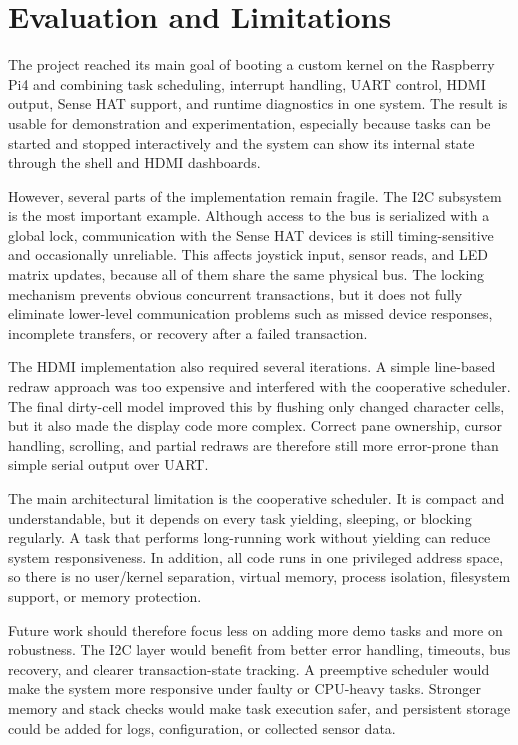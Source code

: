 \section{Evaluation and Limitations}

The project reached its main goal of booting a custom kernel on the Raspberry Pi4 and combining task scheduling, interrupt handling, UART control, HDMI output, Sense HAT support, and runtime diagnostics in one system. The result is usable for demonstration and experimentation, especially because tasks can be started and stopped interactively and the system can show its internal state through the shell and HDMI dashboards.

However, several parts of the implementation remain fragile. The I2C subsystem is the most important example. Although access to the bus is serialized with a global lock, communication with the Sense HAT devices is still timing-sensitive and occasionally unreliable. This affects joystick input, sensor reads, and LED matrix updates, because all of them share the same physical bus. The locking mechanism prevents obvious concurrent transactions, but it does not fully eliminate lower-level communication problems such as missed device responses, incomplete transfers, or recovery after a failed transaction.

The HDMI implementation also required several iterations. A simple line-based redraw approach was too expensive and interfered with the cooperative scheduler. The final dirty-cell model improved this by flushing only changed character cells, but it also made the display code more complex. Correct pane ownership, cursor handling, scrolling, and partial redraws are therefore still more error-prone than simple serial output over UART.

The main architectural limitation is the cooperative scheduler. It is compact and understandable, but it depends on every task yielding, sleeping, or blocking regularly. A task that performs long-running work without yielding can reduce system responsiveness. In addition, all code runs in one privileged address space, so there is no user/kernel separation, virtual memory, process isolation, filesystem support, or memory protection.

Future work should therefore focus less on adding more demo tasks and more on robustness. The I2C layer would benefit from better error handling, timeouts, bus recovery, and clearer transaction-state tracking. A preemptive scheduler would make the system more responsive under faulty or CPU-heavy tasks. Stronger memory and stack checks would make task execution safer, and persistent storage could be added for logs, configuration, or collected sensor data.